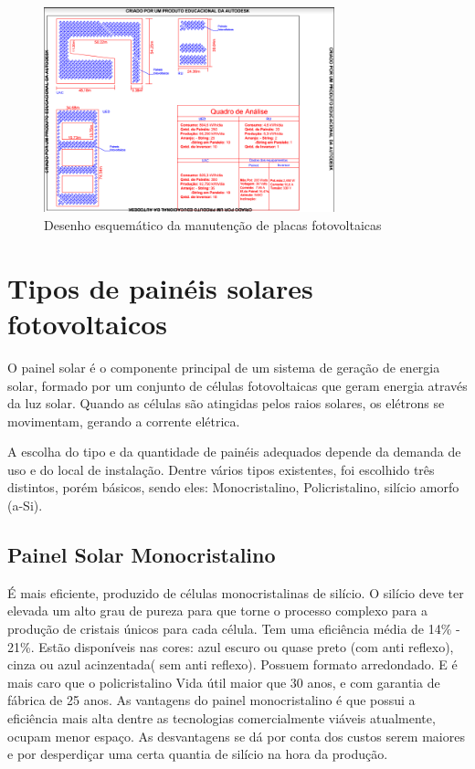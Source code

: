 \begin{figure}[!h]
\centering
\includegraphics[width=0.75\textwidth]{figuras/fotovoltaica.png}
\caption{Desenho esquemático da manutenção de placas fotovoltaicas}
\label{fig:fotovoltaica}
\end{figure}

\section{Tipos de painéis solares fotovoltaicos}

O painel solar é o componente principal de um sistema de geração de energia solar, formado por um conjunto de células fotovoltaicas que geram energia através da luz solar. Quando  as células são atingidas pelos raios solares, os elétrons se movimentam, gerando a corrente elétrica.

A escolha do tipo e da quantidade de painéis adequados depende da demanda de uso e do local de instalação. Dentre vários tipos existentes, foi escolhido três distintos, porém básicos, sendo eles: Monocristalino, Policristalino, silício amorfo (a-Si).

\subsection{Painel Solar Monocristalino}

É mais eficiente, produzido de células monocristalinas de silício. O silício deve ter elevada um alto grau de pureza para que torne o processo complexo para a produção de cristais únicos para cada célula. Tem uma eficiência média de 14\% - 21\%. Estão disponíveis nas cores: azul escuro ou quase preto (com anti reflexo), cinza ou azul acinzentada( sem anti reflexo). Possuem formato arredondado. E é mais caro que o policristalino Vida útil maior que 30 anos, e com garantia de fábrica de 25 anos. As vantagens do painel monocristalino é  que possui a eficiência mais alta dentre as tecnologias comercialmente viáveis atualmente, ocupam menor espaço. As desvantagens se dá por conta dos custos serem maiores e por desperdiçar uma certa quantia de silício na hora da produção.

